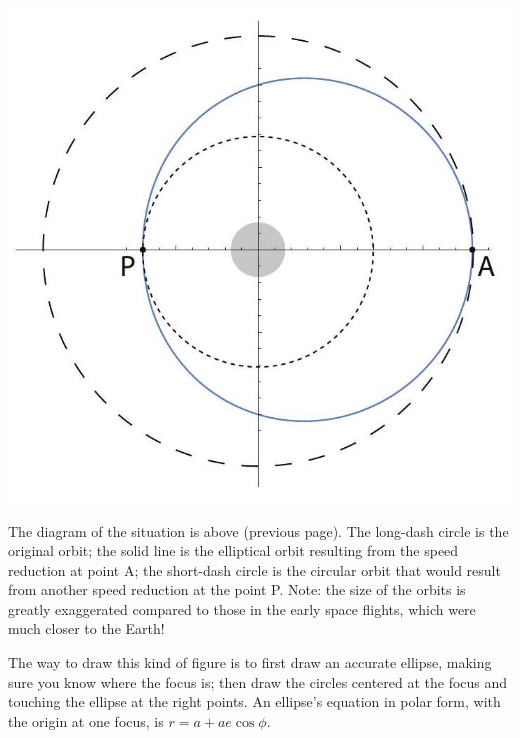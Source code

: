 \documentclass[10pt]{article}
\begin{document}
\begin{center}
\includegraphics[max width=\textwidth]{2024_09_14_9969b06773f10b6936e8g-262}
\end{center}

The diagram of the situation is above (previous page). The long-dash circle is the original orbit; the solid line is the elliptical orbit resulting from the speed reduction at point A; the short-dash circle is the circular orbit that would result from another speed reduction at the point P. Note: the size of the orbits is greatly exaggerated compared to those in the early space flights, which were much closer to the Earth!

The way to draw this kind of figure is to first draw an accurate ellipse, making sure you know where the focus is; then draw the circles centered at the focus and touching the ellipse at the right points. An ellipse's equation in polar form, with the origin at one focus, is $r=a+a e \cos \phi$.
\end{document}
